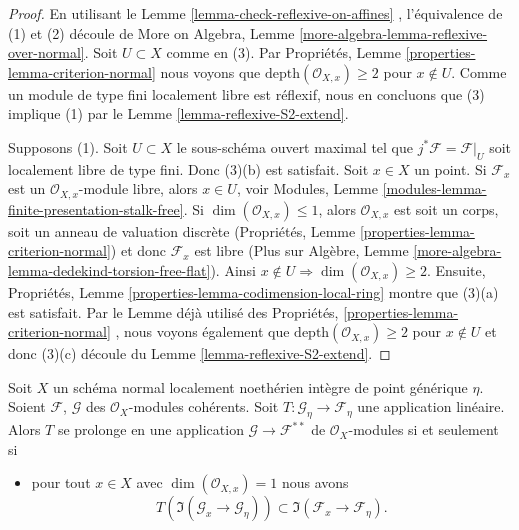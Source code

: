 \begin{proof}
En utilisant le Lemme  \ref{lemma-check-reflexive-on-affines} , l'équivalence de (1) et (2) découle de More on
Algebra, Lemme  \ref{more-algebra-lemma-reflexive-over-normal}. Soit  $U \subset X$  comme en (3). Par Propriétés, Lemme
 \ref{properties-lemma-criterion-normal}  nous voyons que  $\text{depth}(\mathcal{O}_{X, x}) \geq 2$  pour  $x \not \in U$. Comme un module de
type fini localement libre est réflexif, nous en concluons que (3) implique (1)
par le Lemme  \ref{lemma-reflexive-S2-extend}.

\medskip\noindent
Supposons (1). Soit  $U \subset X$  le sous-schéma ouvert maximal tel que
 $j^*\mathcal{F} = \mathcal{F}|_U$  soit localement libre de type fini. Donc (3)(b) est satisfait. Soit
 $x \in X$  un point. Si  $\mathcal{F}_x$  est un  $\mathcal{O}_{X, x}$-module libre, alors
 $x \in U$, voir Modules, Lemme  \ref{modules-lemma-finite-presentation-stalk-free}. Si  $\dim(\mathcal{O}_{X, x}) \leq 1$, alors
 $\mathcal{O}_{X, x}$  est soit un corps, soit un anneau de valuation discrète (Propriétés,
Lemme  \ref{properties-lemma-criterion-normal}) et donc  $\mathcal{F}_x$  est libre (Plus sur Algèbre, Lemme
 \ref{more-algebra-lemma-dedekind-torsion-free-flat}). Ainsi  $x \not \in U \Rightarrow \dim(\mathcal{O}_{X, x}) \geq 2$. Ensuite, Propriétés, Lemme  \ref{properties-lemma-codimension-local-ring}  montre
que (3)(a) est satisfait. Par le Lemme déjà utilisé des Propriétés,  \ref{properties-lemma-criterion-normal} ,
nous voyons également que  $\text{depth}(\mathcal{O}_{X, x}) \geq 2$  pour  $x \not \in U$  et donc (3)(c) découle du
Lemme  \ref{lemma-reflexive-S2-extend}.
\end{proof}

\begin{lemma}
\label{lemma-describe-reflexive-hull}
Soit  $X$  un schéma normal localement noethérien intègre de point
générique  $\eta$. Soient  $\mathcal{F}$,  $\mathcal{G}$  des  $\mathcal{O}_X$-modules
cohérents. Soit  $T : \mathcal{G}_\eta \to \mathcal{F}_\eta$  une application linéaire. Alors  $T$  se
prolonge en une application  $\mathcal{G} \to \mathcal{F}^{**}$  de  $\mathcal{O}_X$-modules si et seulement
si
\begin{itemize}
\item[(*)] pour tout  $x \in X$  avec  $\dim(\mathcal{O}_{X, x}) = 1$  nous avons
$$
T\left(\Im(\mathcal{G}_x \to \mathcal{G}_\eta)\right) \subset
\Im(\mathcal{F}_x \to \mathcal{F}_\eta).
$$
\end{itemize}
\end{lemma}

